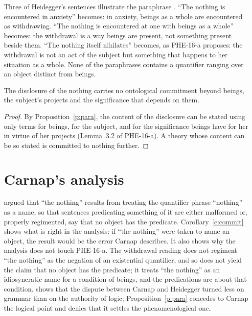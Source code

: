 \documentclass{situationist-preprint}
\begin{document}
Three of Heidegger's sentences illustrate the paraphrase \citep{Heidegger1929}. \enquote{The nothing is encountered in anxiety} becomes: in anxiety, beings as a whole are encountered as withdrawing. \enquote{The nothing is encountered at one with beings as a whole} becomes: the withdrawal is a way beings are present, not something present beside them. \enquote{The nothing itself nihilates} becomes, as PHE-16-a proposes: the withdrawal is not an act of the subject but something that happens to her situation as a whole. None of the paraphrases contains a quantifier ranging over an object distinct from beings.

\begin{corollary}\label{c:commit}
The disclosure of the nothing carries no ontological commitment beyond beings, the subject's projects and the significance that depends on them.
\end{corollary}

\begin{proof}
By Proposition~\ref{p:para}, the content of the disclosure can be stated using only terms for beings, for the subject, and for the significance beings have for her in virtue of her projects (Lemma~3.2 of PHE-16-a). A theory whose content can be so stated is committed to nothing further.
\end{proof}

\section{Carnap's analysis}

\citet{Carnap1932} argued that \enquote{the nothing} results from treating the quantifier phrase \enquote{nothing} as a name, so that sentences predicating something of it are either malformed or, properly regimented, say that no object has the predicate. Corollary~\ref{c:commit} shows what is right in the analysis: if \enquote{the nothing} were taken to name an object, the result would be the error Carnap describes. It also shows why the analysis does not touch PHE-16-a. The withdrawal reading does not regiment \enquote{the nothing} as the negation of an existential quantifier, and so does not yield the claim that no object has the predicate; it treats \enquote{the nothing} as an idiosyncratic name for a condition of beings, and the predications are about that condition. \citet{Friedman2000} shows that the dispute between Carnap and Heidegger turned less on grammar than on the authority of logic; Proposition~\ref{p:para} concedes to Carnap the logical point and denies that it settles the phenomenological one.
\end{document}
